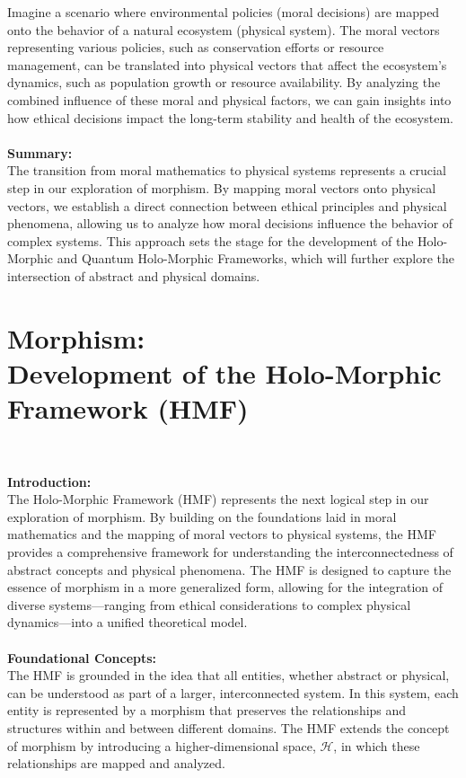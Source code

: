 \documentclass{article}
\begin{document}
Imagine a scenario where environmental policies (moral decisions) are mapped onto the behavior of a natural ecosystem (physical system). The moral vectors representing various policies, such as conservation efforts or resource management, can be translated into physical vectors that affect the ecosystem's dynamics, such as population growth or resource availability. By analyzing the combined influence of these moral and physical factors, we can gain insights into how ethical decisions impact the long-term stability and health of the ecosystem.
\\
\\

\textbf{Summary:}
\\

The transition from moral mathematics to physical systems represents a crucial step in our exploration of morphism. By mapping moral vectors onto physical vectors, we establish a direct connection between ethical principles and physical phenomena, allowing us to analyze how moral decisions influence the behavior of complex systems. This approach sets the stage for the development of the Holo-Morphic and Quantum Holo-Morphic Frameworks, which will further explore the intersection of abstract and physical domains.


\section*{Morphism:
\\
Development of the Holo-Morphic Framework (HMF)}
\

\textbf{Introduction:}
\\

The Holo-Morphic Framework (HMF) represents the next logical step in our exploration of morphism. By building on the foundations laid in moral mathematics and the mapping of moral vectors to physical systems, the HMF provides a comprehensive framework for understanding the interconnectedness of abstract concepts and physical phenomena. The HMF is designed to capture the essence of morphism in a more generalized form, allowing for the integration of diverse systems—ranging from ethical considerations to complex physical dynamics—into a unified theoretical model.
\\
\\

\textbf{Foundational Concepts:}
\\

The HMF is grounded in the idea that all entities, whether abstract or physical, can be understood as part of a larger, interconnected system. In this system, each entity is represented by a morphism that preserves the relationships and structures within and between different domains. The HMF extends the concept of morphism by introducing a higher-dimensional space, \( \mathcal{H} \), in which these relationships are mapped and analyzed.
\end{document}
